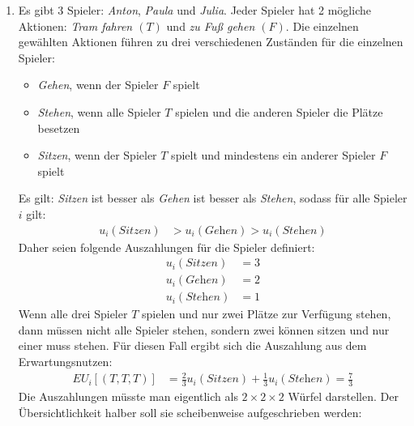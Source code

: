 \begin{enumerate}
  \item Es gibt 3 Spieler: \textit{Anton}, \textit{Paula} und \textit{Julia}.
    Jeder Spieler hat 2 mögliche Aktionen: \textit{Tram fahren $(T)$} und \textit{zu Fuß
    gehen $(F)$}.
    Die einzelnen gewählten Aktionen führen zu drei verschiedenen Zuständen für die
    einzelnen Spieler:
    \begin{itemize}
      \item \textit{Gehen}, wenn der Spieler $F$ spielt
      \item \textit{Stehen}, wenn alle Spieler $T$ spielen und die anderen Spieler die
        Plätze besetzen
      \item \textit{Sitzen}, wenn der Spieler $T$ spielt und mindestens ein anderer
        Spieler $F$ spielt
    \end{itemize}

    Es gilt: \textit{Sitzen} ist besser als \textit{Gehen} ist besser als \textit{Stehen},
    sodass für alle Spieler $i$ gilt:
    \begin{align*}
      u_i(\textit{Sitzen}) & > u_i(\textit{Gehen}) > u_i(\textit{Stehen})
    \end{align*}
    Daher seien folgende Auszahlungen für die Spieler definiert:
    \begin{align*}
      u_i(\textit{Sitzen}) & = 3\\
      u_i(\textit{Gehen})  & = 2\\
      u_i(\textit{Stehen}) & = 1
    \end{align*}
    Wenn alle drei Spieler $T$ spielen und nur zwei Plätze zur Verfügung stehen, dann
    müssen nicht alle Spieler stehen, sondern zwei können sitzen und nur einer muss
    stehen.
    Für diesen Fall ergibt sich die Auszahlung aus dem Erwartungsnutzen:
    \begin{align*}
      EU_i\left[(T,T,T)\right] &
        = \frac{2}{3} u_i(\textit{Sitzen}) + \frac{1}{3} u_i(\textit{Stehen})
        = \frac{7}{3}
    \end{align*}
    Die Auszahlungen müsste man eigentlich als $2 \times 2 \times 2$ Würfel darstellen.
    Der Übersichtlichkeit halber soll sie scheibenweise aufgeschrieben werden:


\end{enumerate}

